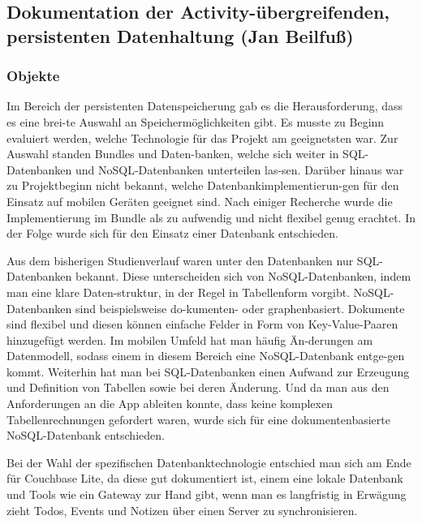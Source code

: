 \subsection{Dokumentation der Activity-übergreifenden, persistenten Datenhaltung (Jan Beilfuß)}

\subsubsection{Objekte}
Im Bereich der persistenten Datenspeicherung gab es die Herausforderung, dass es eine brei-te Auswahl an Speichermöglichkeiten gibt. Es musste zu Beginn evaluiert werden, welche Technologie für das Projekt am geeignetsten war. Zur Auswahl standen Bundles und Daten-banken, welche sich weiter in SQL-Datenbanken und NoSQL-Datenbanken unterteilen las-sen. Darüber hinaus war zu Projektbeginn nicht bekannt, welche Datenbankimplementierun-gen für den Einsatz auf mobilen Geräten geeignet sind. Nach einiger Recherche wurde die Implementierung im Bundle als zu aufwendig und nicht flexibel genug erachtet. In der Folge wurde sich für den Einsatz einer Datenbank entschieden.

Aus dem bisherigen Studienverlauf waren unter den Datenbanken nur SQL-Datenbanken bekannt. Diese unterscheiden sich von NoSQL-Datenbanken, indem man eine klare Daten-struktur, in der Regel in Tabellenform vorgibt. NoSQL-Datenbanken sind beispielsweise do-kumenten- oder graphenbasiert. Dokumente sind flexibel und diesen können einfache Felder in Form von Key-Value-Paaren hinzugefügt werden. Im mobilen Umfeld hat man häufig Än-derungen am Datenmodell, sodass einem in diesem Bereich eine NoSQL-Datenbank entge-gen kommt. Weiterhin hat man bei SQL-Datenbanken einen Aufwand zur Erzeugung und Definition von Tabellen sowie bei deren Änderung. Und da man aus den Anforderungen an die App ableiten konnte, dass keine komplexen Tabellenrechnungen gefordert waren, wurde sich für eine dokumentenbasierte NoSQL-Datenbank entschieden. 

Bei der Wahl der spezifischen Datenbanktechnologie entschied man sich am Ende für Couchbase Lite, da diese gut dokumentiert ist, einem eine lokale Datenbank und Tools wie ein Gateway zur Hand gibt, wenn man es langfristig in Erwägung zieht Todos, Events und Notizen über einen Server zu synchronisieren.

